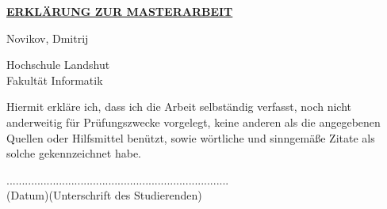 \thispagestyle{empty}
\vspace{15mm}
\begin{center}
\textbf{\underline{ERKLÄRUNG ZUR MASTERARBEIT}}
\end{center}
\vspace{25mm}
\begin{center}
\large
\large
Novikov, Dmitrij
\end{center}
\vspace{25mm}

\begin{center}
\huge
Hochschule Landshut \\
Fakultät Informatik 
\end{center}
\vspace{10mm}

\begin{center}
\large
Hiermit erkläre ich, dass ich die Arbeit selbständig 
verfasst, noch nicht anderweitig für Prüfungszwecke 
vorgelegt, keine anderen als die angegebenen Quellen 
oder Hilfsmittel benützt, sowie wörtliche und sinngemäße 
Zitate als solche gekennzeichnet habe.  \\
\end{center}
\vspace{55mm}

\begin{center}
....................\hspace{40mm}....................................................\\

(Datum)\hspace{47mm}(Unterschrift des Studierenden)
\end{center}
